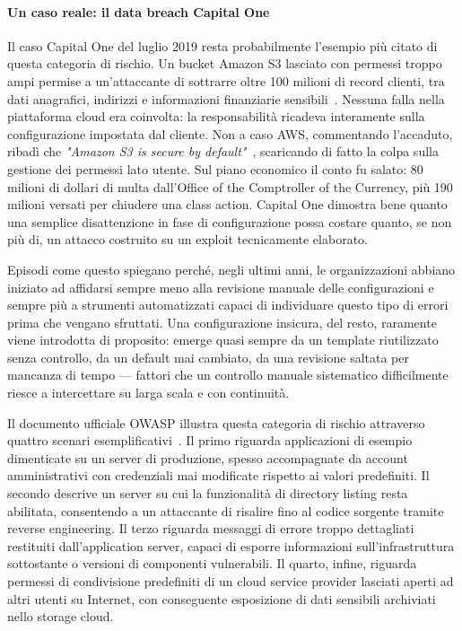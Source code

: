 \paragraph{Un caso reale: il data breach Capital One}
Il caso Capital One del luglio 2019 resta probabilmente l'esempio più citato
di questa categoria di rischio. Un bucket Amazon S3 lasciato con permessi
troppo ampi permise a un'attaccante di sottrarre oltre 100 milioni di record
clienti, tra dati anagrafici, indirizzi e informazioni finanziarie
sensibili~\cite{sentinelone2025cloud}. Nessuna falla nella piattaforma
cloud era coinvolta: la responsabilità ricadeva interamente sulla
configurazione impostata dal cliente. Non a caso AWS, commentando
l'accaduto, ribadì che \textit{"Amazon S3 is secure by
default"}~\cite{news2023failures}, scaricando di fatto la colpa sulla
gestione dei permessi lato utente. Sul piano economico il conto fu salato:
80 milioni di dollari di multa dall'Office of the Comptroller of the
Currency, più 190 milioni versati per chiudere una class action. Capital One
dimostra bene quanto una semplice disattenzione in fase di configurazione
possa costare quanto, se non più di, un attacco costruito su un exploit
tecnicamente elaborato.

\bigskip

Episodi come questo spiegano perché, negli ultimi anni, le organizzazioni
abbiano iniziato ad affidarsi sempre meno alla revisione manuale delle
configurazioni e sempre più a strumenti automatizzati capaci di individuare
questo tipo di errori prima che vengano sfruttati. Una configurazione
insicura, del resto, raramente viene introdotta di proposito: emerge quasi
sempre da un template riutilizzato senza controllo, da un default mai
cambiato, da una revisione saltata per mancanza di tempo — fattori che un
controllo manuale sistematico difficilmente riesce a intercettare su larga
scala e con continuità.

Il documento ufficiale OWASP illustra questa categoria di rischio attraverso
quattro scenari esemplificativi~\cite{owasp2021a05}. Il primo riguarda
applicazioni di esempio dimenticate su un server di produzione, spesso
accompagnate da account amministrativi con credenziali mai modificate
rispetto ai valori predefiniti. Il secondo descrive un server su cui la
funzionalità di directory listing resta abilitata, consentendo a un
attaccante di risalire fino al codice sorgente tramite reverse engineering.
Il terzo riguarda messaggi di errore troppo dettagliati restituiti
dall'application server, capaci di esporre informazioni sull'infrastruttura
sottostante o versioni di componenti vulnerabili. Il quarto, infine,
riguarda permessi di condivisione predefiniti di un cloud service provider
lasciati aperti ad altri utenti su Internet, con conseguente esposizione di
dati sensibili archiviati nello storage cloud.

